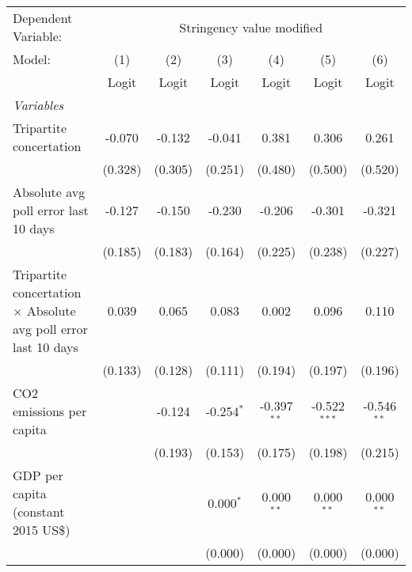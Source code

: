 
\begingroup
\centering
\begin{tabular}{lcccccc}
   \toprule
   Dependent Variable: & \multicolumn{6}{c}{Stringency value modified}\\
   Model:                                                                 & (1)     & (2)     & (3)          & (4)           & (5)            & (6)\\  
                                                                          &  Logit  & Logit   & Logit        & Logit         & Logit          & Logit\\  
   \midrule
   \emph{Variables}\\
   Tripartite concertation                                                & -0.070  & -0.132  & -0.041       & 0.381         & 0.306          & 0.261\\   
                                                                          & (0.328) & (0.305) & (0.251)      & (0.480)       & (0.500)        & (0.520)\\   
   Absolute avg poll error last 10 days                                   & -0.127  & -0.150  & -0.230       & -0.206        & -0.301         & -0.321\\   
                                                                          & (0.185) & (0.183) & (0.164)      & (0.225)       & (0.238)        & (0.227)\\   
   Tripartite concertation $\times$ Absolute avg poll error last 10 days  & 0.039   & 0.065   & 0.083        & 0.002         & 0.096          & 0.110\\   
                                                                          & (0.133) & (0.128) & (0.111)      & (0.194)       & (0.197)        & (0.196)\\   
   CO2 emissions per capita                                               &         & -0.124  & -0.254$^{*}$ & -0.397$^{**}$ & -0.522$^{***}$ & -0.546$^{**}$\\   
                                                                          &         & (0.193) & (0.153)      & (0.175)       & (0.198)        & (0.215)\\   
   GDP per capita (constant 2015 US\$)                                    &         &         & 0.000$^{*}$  & 0.000$^{**}$  & 0.000$^{**}$   & 0.000$^{**}$\\   
                                                                          &         &         & (0.000)      & (0.000)       & (0.000)        & (0.000)\\   

\end{tabular}
